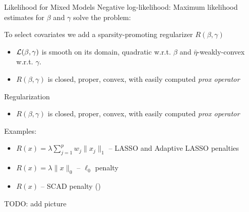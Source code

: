 \documentclass[8pt]{beamer}
\begin{document}
\begin{frame}{Likelihood for Mixed Models}
Negative log-likelihood:
Maximum likelihood estimates for $\beta$ and $\gamma$ solve the problem:

To select covariates we add a sparsity-promoting regularizer $R(\beta, \gamma)$

\begin{itemize}
	\item $\operatorname{\mathcal{L}}(\beta, \gamma)$ is smooth on its domain, quadratic w.r.t. $\beta$ and $\bar\eta$-weakly-convex w.r.t. $\gamma$.
	\item $R(\beta, \gamma)$ is closed, proper, convex, with easily computed \textit{prox operator}
\end{itemize}

\end{frame}

\begin{frame}{Regularization}
\begin{itemize}
	\item $R(\beta, \gamma)$ is closed, proper, convex, with easily computed \textit{prox operator}
\end{itemize}


Examples: 
\begin{itemize}
	\item $R(x) = \lambda\sum_{j=1}^p w_j\|x_j\|_1$ -- LASSO and Adaptive LASSO penalties \cite{Bondell2010,Lin2013}
	\item $R(x) = \lambda \|x\|_0$ -- $\ell_0$ penalty \cite{Vaida2005,Jones2011}
	\item $R(x)$ -- SCAD penalty (\cite{Fan2001,Fan2012})
\end{itemize}

TODO: add picture

\end{frame}
\end{document}
